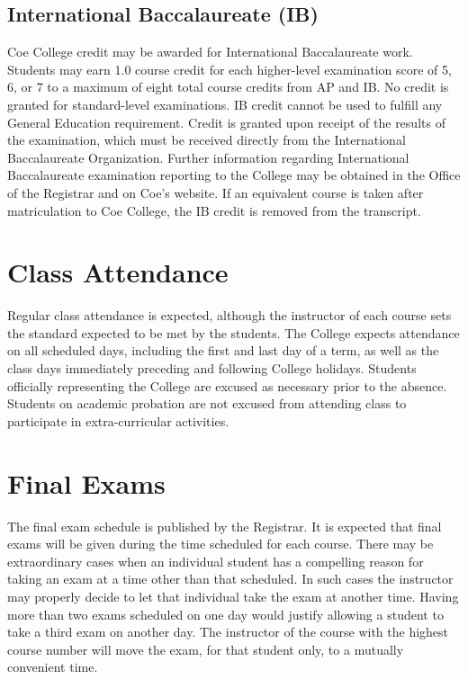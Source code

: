 \documentclass[
  letterpaper,
]{scrbook}
\begin{document}
\subsection{International Baccalaureate
(IB)}\label{international-baccalaureate-ib}

Coe College credit may be awarded for International Baccalaureate work.
Students may earn 1.0 course credit for each higher-level examination
score of 5, 6, or 7 to a maximum of eight total course credits from AP
and IB. No credit is granted for standard-level examinations. IB credit
cannot be used to fulfill any General Education requirement. Credit is
granted upon receipt of the results of the examination, which must be
received directly from the International Baccalaureate Organization.
Further information regarding International Baccalaureate examination
reporting to the College may be obtained in the Office of the Registrar
and on Coe's website. If an equivalent course is taken after
matriculation to Coe College, the IB credit is removed from the
transcript.

\section{Class Attendance}\label{class-attendance}

Regular class attendance is expected, although the instructor of each
course sets the standard expected to be met by the students. The College
expects attendance on all scheduled days, including the first and last
day of a term, as well as the class days immediately preceding and
following College holidays. Students officially representing the College
are excused as necessary prior to the absence. Students on academic
probation are not excused from attending class to participate in
extra-curricular activities.

\section{Final Exams}\label{final-exams}

The final exam schedule is published by the Registrar. It is expected
that final exams will be given during the time scheduled for each
course. There may be extraordinary cases when an individual student has
a compelling reason for taking an exam at a time other than that
scheduled. In such cases the instructor may properly decide to let that
individual take the exam at another time. Having more than two exams
scheduled on one day would justify allowing a student to take a third
exam on another day. The instructor of the course with the highest
course number will move the exam, for that student only, to a mutually
convenient time.
\end{document}

